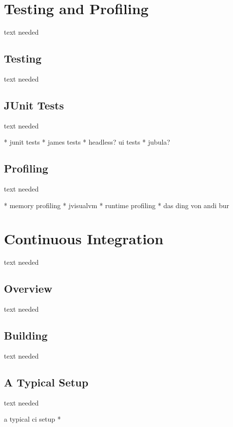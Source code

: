 \documentclass[a4paper,10pt,twoside]{book}
\begin{document}
  \sloppy
\fi


\chapter{Testing and Profiling}
text needed

\section{Testing}
text needed

\section{JUnit Tests}
text needed

  * junit tests
  * james tests
  * headless? ui tests 
  * jubula?

\section{Profiling}
text needed

  * memory profiling
    * jvisualvm
  * runtime profiling
    * das ding von andi bur


\chapter{Continuous Integration}
text needed

\section{Overview}
text needed

\section{Building}
text needed
 
\section{A Typical Setup}
text needed

  a typical ci setup
  * 


\ifx\wholebook\relax\else
   
   
\end{document}
